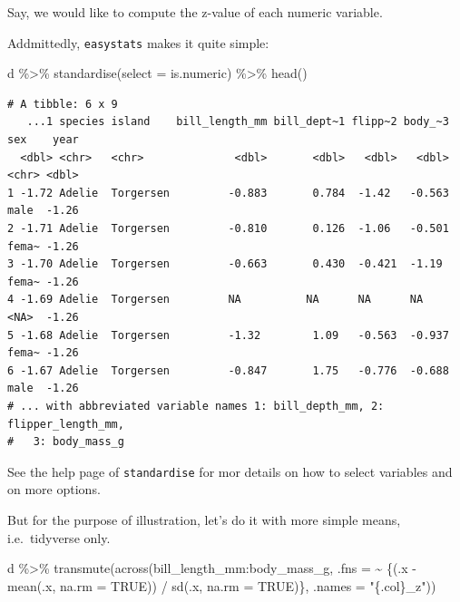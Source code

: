 \documentclass[
  letterpaper,
  DIV=11,
  numbers=noendperiod]{scrreprt}
\newenvironment{Shaded}{\begin{snugshade}}{\end{snugshade}}
\newcommand{\AttributeTok}[1]{\textcolor[rgb]{0.40,0.45,0.13}{#1}}
\newcommand{\ConstantTok}[1]{\textcolor[rgb]{0.56,0.35,0.01}{#1}}
\newcommand{\FunctionTok}[1]{\textcolor[rgb]{0.28,0.35,0.67}{#1}}
\newcommand{\NormalTok}[1]{\textcolor[rgb]{0.00,0.23,0.31}{#1}}
\newcommand{\SpecialCharTok}[1]{\textcolor[rgb]{0.37,0.37,0.37}{#1}}
\newcommand{\StringTok}[1]{\textcolor[rgb]{0.13,0.47,0.30}{#1}}
\theoremstyle{definition}
\theoremstyle{definition}
\theoremstyle{remark}
\begin{document}
Say, we would like to compute the z-value of each numeric variable.

Addmittedly, \texttt{easystats} makes it quite simple:

\begin{Shaded}
\begin{Highlighting}[]
\NormalTok{d }\SpecialCharTok{\%\textgreater{}\%} 
  \FunctionTok{standardise}\NormalTok{(}\AttributeTok{select =}\NormalTok{ is.numeric) }\SpecialCharTok{\%\textgreater{}\%} 
  \FunctionTok{head}\NormalTok{()}
\end{Highlighting}
\end{Shaded}

\begin{verbatim}
# A tibble: 6 x 9
   ...1 species island    bill_length_mm bill_dept~1 flipp~2 body_~3 sex    year
  <dbl> <chr>   <chr>              <dbl>       <dbl>   <dbl>   <dbl> <chr> <dbl>
1 -1.72 Adelie  Torgersen         -0.883       0.784  -1.42   -0.563 male  -1.26
2 -1.71 Adelie  Torgersen         -0.810       0.126  -1.06   -0.501 fema~ -1.26
3 -1.70 Adelie  Torgersen         -0.663       0.430  -0.421  -1.19  fema~ -1.26
4 -1.69 Adelie  Torgersen         NA          NA      NA      NA     <NA>  -1.26
5 -1.68 Adelie  Torgersen         -1.32        1.09   -0.563  -0.937 fema~ -1.26
6 -1.67 Adelie  Torgersen         -0.847       1.75   -0.776  -0.688 male  -1.26
# ... with abbreviated variable names 1: bill_depth_mm, 2: flipper_length_mm,
#   3: body_mass_g
\end{verbatim}

See the help page of \texttt{standardise} for mor details on how to
select variables and on more options.

But for the purpose of illustration, let's do it with more simple means,
i.e.~tidyverse only.

\begin{Shaded}
\begin{Highlighting}[]
\NormalTok{d }\SpecialCharTok{\%\textgreater{}\%} 
  \FunctionTok{transmute}\NormalTok{(}\FunctionTok{across}\NormalTok{(bill\_length\_mm}\SpecialCharTok{:}\NormalTok{body\_mass\_g, }
                \AttributeTok{.fns =} \SpecialCharTok{\textasciitilde{}}\NormalTok{ \{(.x }\SpecialCharTok{{-}} \FunctionTok{mean}\NormalTok{(.x, }\AttributeTok{na.rm =} \ConstantTok{TRUE}\NormalTok{)) }\SpecialCharTok{/} \FunctionTok{sd}\NormalTok{(.x, }\AttributeTok{na.rm =} \ConstantTok{TRUE}\NormalTok{)\},}
                \AttributeTok{.names =} \StringTok{"\{.col\}\_z"}\NormalTok{))}
\end{Highlighting}
\end{Shaded}
\end{document}
